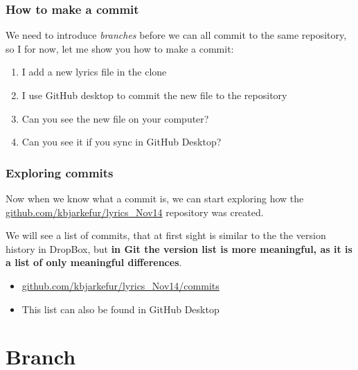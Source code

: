 \documentclass[aspectratio=169]{beamer} %
\newcommand{\trainingURL}[1]{{\color{blue}\url{#1}}}
\newcommand{\traininerUsername}{kbjarkefur}
\newcommand{\repoName}{\traininerUsername/lyrics\_Nov14}
\newcommand{\trainingRepoURL}[1]{\trainingURL{github.com/\repoName #1}}
\begin{document}
\begin{frame}
\frametitle{How to make a commit}

	We need to introduce \textit{branches} before we can all commit to the same repository, so I for now, let me show you how to make a commit:
	
	\begin{enumerate}
		\item I add a new lyrics file in the clone
		\item I use GitHub desktop to commit the new file to the repository
		\item Can you see the new file on your computer?
		\item Can you see it if you sync in GitHub Desktop?
	\end{enumerate}	

\end{frame}


\begin{frame}
\frametitle{Exploring commits}

	Now when we know what a commit is, we can start exploring how the \trainingRepoURL{} repository was created.
	
	\vspace{.25cm}
	
	We will see a list of commits, that at first sight is similar to the the version history in DropBox, but \textbf{in Git the version list is more meaningful, as it is a list of only meaningful differences}.

	\vspace{.25cm}
	
	\begin{itemize}
		\item \trainingRepoURL{/commits}
		\item This list can also be found in GitHub Desktop
	\end{itemize}	

\end{frame}

\section{Branch}
\end{document}
